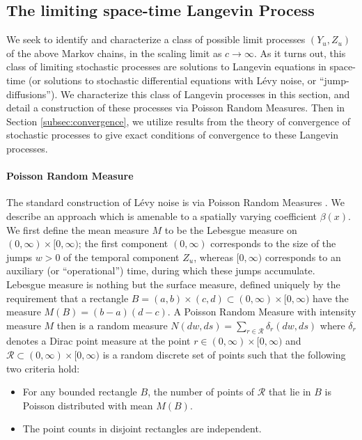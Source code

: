\documentclass[a4paper,12pt]{elsarticle}
\numberwithin{equation}{section}
\theoremstyle{plain}
\theoremstyle{definition}
\theoremstyle{remark}
\numberwithin{equation}{section}
\newcommand{\1}{\mathbf 1}
\begin{document}
\subsection{The limiting space-time Langevin Process}

We seek to identify and characterize a class of possible limit processes
$(Y_u, Z_u)$ of the above Markov chains,
in the scaling limit as $c \to \infty$. As it turns out, this class of 
limiting stochastic processes are solutions to
Langevin equations in space-time (or solutions to stochastic differential
equations with L\'evy noise, or ``jump-diffusions'').
We characterize this class of Langevin processes in this section, and detail 
a construction of these processes via Poisson Random Measures.
Then in Section \ref{subsec:convergence}, we utilize results from the theory of
convergence of stochastic processes to give exact conditions of convergence
to these Langevin processes.

\paragraph{Poisson Random Measure}
The standard construction of L\'evy noise is via Poisson Random Measures
\cite{Applebaum}.  We describe an approach which is amenable to a 
spatially varying coefficient $\beta(x)$. 
We first define the mean measure $M$ to be the Lebesgue measure on 
$(0,\infty) \times [0,\infty)$; the first component $(0,\infty)$ corresponds 
to the size of the jumps $w > 0$ of the temporal component $Z_u$, whereas $[0,\infty)$
corresponds to an auxiliary (or ``operational'') time, during which these jumps accumulate. 
Lebesgue measure is nothing but the surface measure, defined uniquely by the requirement 
that a rectangle $B = (a,b) \times (c,d) \subset (0,\infty) \times [0,\infty)$
have the measure $M(B) = (b-a)(d-c)$.  
A Poisson Random Measure with intensity measure $M$ then is a random measure 
$N(dw, ds) = \sum_{r \in \mathcal R} \delta_{r}(dw, ds)$ where $\delta_r$ 
denotes a Dirac point measure at the point $r \in (0,\infty) \times [0,\infty)$
and $\mathcal R \subset (0,\infty) \times [0,\infty)$ is a random discrete set of points 
such that the following two criteria hold: 
\begin{itemize}
  \item 
  For any bounded rectangle $B$, the number of 
  points of $\mathcal R$ that lie in $B$ is Poisson distributed with mean 
  $M(B)$.
  \item
  The point counts in disjoint rectangles are independent. 
\end{itemize}
\end{document}
